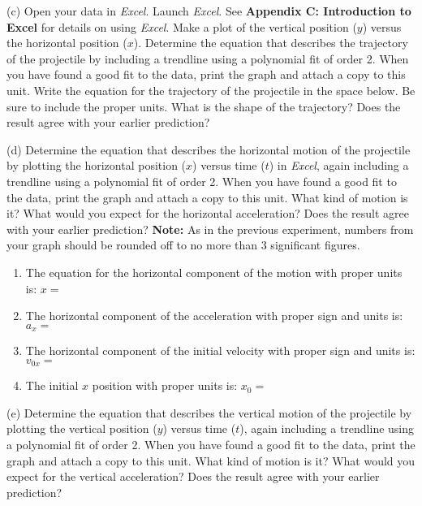 (c) Open your data in \textit{Excel}.
Launch \textit{Excel}. 
See \textbf{Appendix C: Introduction to Excel} for details on using
\textit{Excel}. Make a plot of the vertical position ($y$) versus the
horizontal position ($x$). Determine the equation that describes the trajectory
of the projectile by including a trendline using a polynomial fit of order 2. 
 When you have found a good fit to the data, print the graph
and attach a copy to this unit. Write the equation for the trajectory of the
projectile in the space below. Be sure to include the proper units. What is the shape of the trajectory? Does the result agree with your earlier prediction?
\vspace{20mm}

(d) Determine the equation that describes the horizontal motion of the projectile by plotting the horizontal position ($x$) versus time ($t$) in
\textit{Excel}, again including a trendline using a polynomial fit of order 2. 
When you have
found a good fit to the data, print the graph and attach a copy to this unit.
What kind of motion is it? What would you expect for the horizontal acceleration? Does the result agree with your earlier prediction?
\textbf{Note:} As in the previous experiment, numbers from your graph should be rounded off to no more than 3 significant figures.
\vspace{8mm}

\begin{enumerate}
\item The equation for the horizontal component of the motion with proper units is:
$x =$\vspace{5mm}

\item The horizontal component of the acceleration with proper sign and units is:
\( a_{x}= \) \vspace{5mm}

\item The horizontal component of the initial velocity with proper sign and units
is: \( v_{0x}= \)\vspace{5mm}

\item The initial $x$ position with proper units is: \( x_{0}= \)\vspace{5mm}

\end{enumerate}
(e) Determine the equation that describes the vertical motion of the projectile
by plotting the vertical position ($y$) versus time ($t$), again including a trendline using a polynomial fit of order 2.  When you have found a good fit to the data, print the graph and attach
a copy to this unit. What kind of motion is it? What would you expect for the vertical acceleration? Does the result agree with your earlier prediction?
\vspace{15mm}

